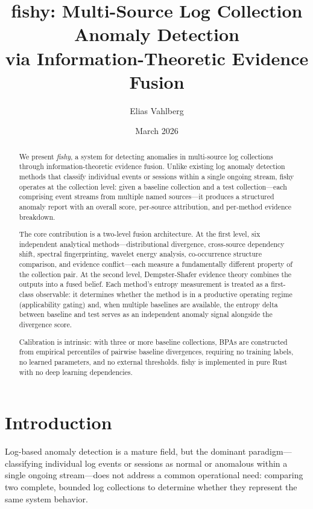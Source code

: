 \documentclass[10pt,twocolumn]{article}
\title{\textbf{fishy: Multi-Source Log Collection Anomaly Detection\\via Information-Theoretic Evidence Fusion}}
\author{Elias Vahlberg}
\date{March 2026}
\begin{document}
\maketitle

\begin{abstract}
We present \textit{fishy}, a system for detecting anomalies in multi-source log collections through information-theoretic evidence fusion. Unlike existing log anomaly detection methods that classify individual events or sessions within a single ongoing stream, fishy operates at the collection level: given a baseline collection and a test collection---each comprising event streams from multiple named sources---it produces a structured anomaly report with an overall score, per-source attribution, and per-method evidence breakdown.

The core contribution is a two-level fusion architecture. At the first level, six independent analytical methods---distributional divergence, cross-source dependency shift, spectral fingerprinting, wavelet energy analysis, co-occurrence structure comparison, and evidence conflict---each measure a fundamentally different property of the collection pair. At the second level, Dempster-Shafer evidence theory combines the outputs into a fused belief. Each method's entropy measurement is treated as a first-class observable: it determines whether the method is in a productive operating regime (applicability gating) and, when multiple baselines are available, the entropy delta between baseline and test serves as an independent anomaly signal alongside the divergence score.

Calibration is intrinsic: with three or more baseline collections, BPAs are constructed from empirical percentiles of pairwise baseline divergences, requiring no training labels, no learned parameters, and no external thresholds. fishy is implemented in pure Rust with no deep learning dependencies.
\end{abstract}

\section{Introduction}

Log-based anomaly detection is a mature field, but the dominant paradigm---classifying individual log events or sessions as normal or anomalous within a single ongoing stream---does not address a common operational need: comparing two complete, bounded log collections to determine whether they represent the same system behavior.
\end{document}
